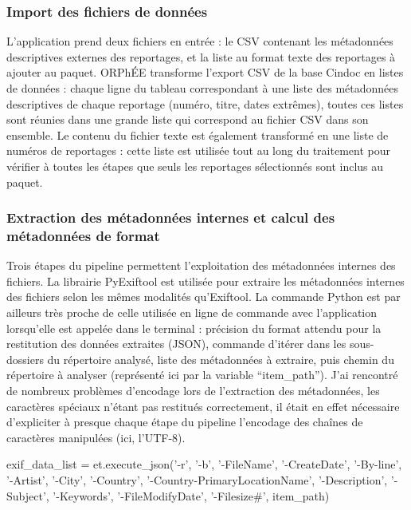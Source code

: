 \subsubsection*{Import des fichiers de données}

L'application prend deux fichiers en entrée : le CSV contenant les métadonnées descriptives externes des reportages, et la liste au format texte des reportages à ajouter au paquet. ORPhÉE transforme l'export CSV de la base Cindoc en listes de données : chaque ligne du tableau correspondant à une liste des métadonnées descriptives de chaque reportage (numéro, titre, dates extrêmes), toutes ces listes sont réunies dans une grande liste qui correspond au fichier CSV dans son ensemble. Le contenu du fichier texte est également transformé en une liste de numéros de reportages : cette liste est utilisée tout au long du traitement pour vérifier à toutes les étapes que seuls les reportages sélectionnés sont inclus au paquet.

\subsubsection*{Extraction des métadonnées internes et calcul des métadonnées de format}

Trois étapes du pipeline permettent l'exploitation des métadonnées internes des fichiers. La librairie PyExiftool est utilisée pour extraire les métadonnées internes des fichiers selon les mêmes modalités qu'Exiftool. La commande Python est par ailleurs très proche de celle utilisée en ligne de commande avec l'application lorsqu'elle est appelée dans le terminal : précision du format attendu pour la restitution des données extraites (JSON), commande d'itérer dans les sous-dossiers du répertoire analysé, liste des métadonnées à extraire, puis chemin du répertoire à analyser (représenté ici par la variable \enquote{item\_path}). J'ai rencontré de nombreux problèmes d'encodage lors de l'extraction des métadonnées, les caractères spéciaux n'étant pas restitués correctement, il était en effet nécessaire d'expliciter à presque chaque étape du pipeline l'encodage des chaînes de caractères manipulées (ici, l'UTF-8).
 \\
\begin{python}
exif_data_list = et.execute_json('-r', '-b', '-FileName', '-CreateDate', '-By-line', '-Artist', '-City', '-Country',
'-Country-PrimaryLocationName', '-Description', '-Subject', '-Keywords', '-FileModifyDate', '-Filesize#', item_path)
\end{python}

